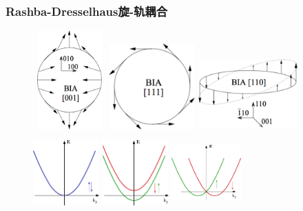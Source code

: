 {\frame
{
	\frametitle{\textrm{Rashba-Dresselhaus}旋-轨耦合}
\begin{figure}[h!]
\centering
\vspace*{-0.05in}
\includegraphics[height=1.5in,width=1.10in,viewport=0 0 520 770,clip]{Figures/SOC_Rashba-Dresselhaus-2.png}
\includegraphics[height=1.3in,width=1.30in,viewport=0 0 590 590,clip]{Figures/SOC_Rashba-Dresselhaus-3.png}
\includegraphics[height=1.1in,width=1.50in,viewport=0 0 750 530,clip]{Figures/SOC_Rashba-Dresselhaus-4.png}
\includegraphics[height=1.2in,width=1.00in,viewport=0 0 390 500,clip]{Figures/SOC_Rashba-3.png}
\includegraphics[height=1.2in,width=1.00in,viewport=0 0 390 500,clip]{Figures/SOC_Rashba-4.png}
\includegraphics[height=1.2in,width=1.05in,viewport=0 0 490 500,clip]{Figures/SOC_Rashba-5.png}

\end{figure}}}
